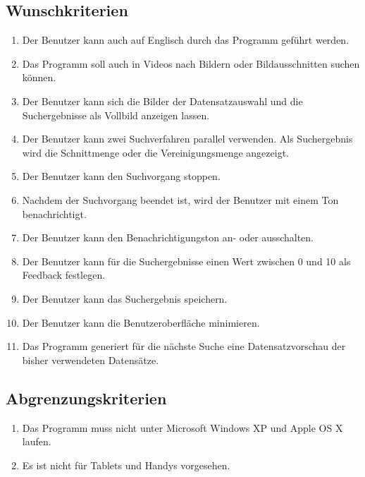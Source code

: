 \subsection{Wunschkriterien}
\begin{enumerate} [label=\bfseries /WK \arabic*0/]
\item Der Benutzer kann auch auf Englisch durch das Programm geführt werden.
\item Das Programm soll auch in Videos nach Bildern oder Bildausschnitten suchen können.
\item Der Benutzer kann sich die Bilder der Datensatzauswahl und die Suchergebnisse als Vollbild anzeigen lassen.
\item Der Benutzer kann zwei Suchverfahren parallel verwenden. Als Suchergebnis wird die Schnittmenge oder die Vereinigungsmenge angezeigt.
\item Der Benutzer kann den Suchvorgang stoppen.
\item Nachdem der Suchvorgang beendet ist, wird der Benutzer mit einem Ton benachrichtigt.
\item Der Benutzer kann den Benachrichtigungston an- oder ausschalten.
\item Der Benutzer kann für die Suchergebnisse einen Wert zwischen 0 und 10 als Feedback festlegen.
\item Der Benutzer kann das Suchergebnis speichern.
\item Der Benutzer kann die Benutzeroberfläche minimieren.
\item Das Programm generiert für die nächste Suche eine Datensatzvorschau der bisher verwendeten Datensätze.
\end{enumerate}
\subsection{Abgrenzungskriterien}
\begin{enumerate} [label=\bfseries /AK \arabic*0/]
\item Das Programm muss nicht unter Microsoft Windows XP und Apple OS X laufen. 
\item Es ist nicht für Tablets und Handys vorgesehen.
\end{enumerate}
\pagebreak